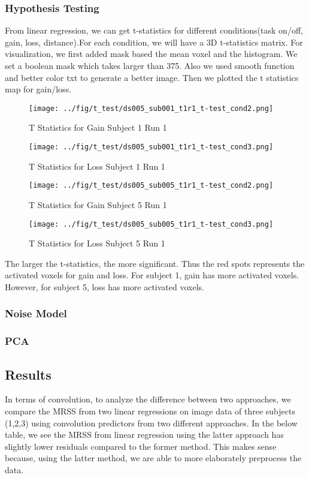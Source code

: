 \subsubsection {Hypothesis Testing}
From linear regression, we can get t-statistics for different conditions(task on/off, gain, loss, distance).For each condition, we will have a 3D t-statistics matrix. For visualization, we first added mask based the mean voxel and the histogram. We set a boolean mask which takes larger than 375. Also we used smooth function and better color txt to generate a better image. Then we plotted the t statistics map for gain/loss. 
\begin{figure}[H] 
\centering \texttt{[image: ../fig/t\_test/ds005\_sub001\_t1r1\_t-test\_cond2.png]}	 
\caption{T Statistics for Gain Subject 1 Run 1}
\end{figure} 
\begin{figure}[H] 
\centering 
\texttt{[image: ../fig/t\_test/ds005\_sub001\_t1r1\_t-test\_cond3.png]} 
\caption{T Statistics for Loss Subject 1 Run 1}
\end{figure}
\begin{figure}[H] 
\centering 
\texttt{[image: ../fig/t\_test/ds005\_sub005\_t1r1\_t-test\_cond2.png]}	 
\caption{T Statistics for Gain Subject 5 Run 1}
\end{figure} 
\begin{figure}[H] 
\centering 
\texttt{[image: ../fig/t\_test/ds005\_sub005\_t1r1\_t-test\_cond3.png]} 
\caption{T Statistics for Loss Subject 5 Run 1}
\end{figure}  
\noindent
The larger the t-statistics, the more significant. Thus the red spots represents the activated voxels for gain and loss. For subject 1, gain has more activated voxels. However, for subject 5, loss has more activated voxels.

\subsubsection {Noise Model}

\subsubsection {PCA}

\subsection {Results}
In terms of convolution, to analyze the difference between two approaches, we compare the MRSS from two linear regressions on image data of three subjects (1,2,3) using convolution predictors from two different approaches. In the below table, we see the MRSS from linear regression using the latter approach has slightly lower residuals compared to the former method. This makes sense because, using the latter method, we are able to more elaborately preprocess the data.





